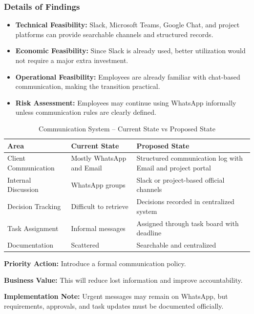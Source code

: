 \documentclass[12pt,a4paper]{report}
\begin{document}
\subsubsection{Details of Findings}

\begin{itemize}[leftmargin=*]
    \item \textbf{Technical Feasibility:} Slack, Microsoft Teams, Google Chat, and project platforms can provide searchable channels and structured records.
    \item \textbf{Economic Feasibility:} Since Slack is already used, better utilization would not require a major extra investment.
    \item \textbf{Operational Feasibility:} Employees are already familiar with chat-based communication, making the transition practical.
    \item \textbf{Risk Assessment:} Employees may continue using WhatsApp informally unless communication rules are clearly defined.
\end{itemize}

\begin{table}[H]
\centering
\caption{Communication System -- Current State vs Proposed State}
\renewcommand{\arraystretch}{1.3}
\begin{tabularx}{\textwidth}{|p{4cm}|X|X|}
\hline
\rowcolor{secondary}
\textbf{Area} & \textbf{Current State} & \textbf{Proposed State} \\
\hline
Client Communication & Mostly WhatsApp and Email & Structured communication log with Email and project portal \\
\hline
Internal Discussion & WhatsApp groups & Slack or project-based official channels \\
\hline
Decision Tracking & Difficult to retrieve & Decisions recorded in centralized system \\
\hline
Task Assignment & Informal messages & Assigned through task board with deadline \\
\hline
Documentation & Scattered & Searchable and centralized \\
\hline
\end{tabularx}
\end{table}

\begin{recommendBox}
\textbf{Priority Action:} Introduce a formal communication policy.

\textbf{Business Value:} This will reduce lost information and improve accountability.

\textbf{Implementation Note:} Urgent messages may remain on WhatsApp, but requirements, approvals, and task updates must be documented officially.
\end{recommendBox}
\end{document}
